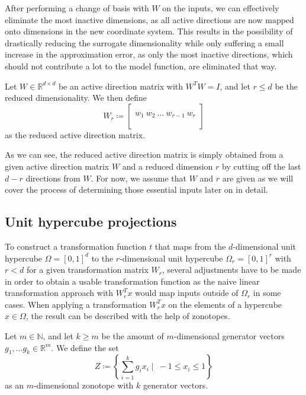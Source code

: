\documentclass[
  a4paper,  %
  twoside,  %
  bibliography=totoc,
  headsepline,
  cleardoublepage=empty,
  parskip=half,
  draft=false
]{scrbook}
\begin{document}
After performing a change of basis with $W$ on the inputs, we can effectively eliminate the most inactive dimensions, as all active directions are now mapped onto dimensions in the new coordinate system.
This results in the possibility of drastically reducing the surrogate dimensionality while only suffering a small increase in the approximation error, as only the most inactive directions, which should not contribute a lot to the model function, are eliminated that way.

\begin{definition}
Let $W \in \mathds{R}^{d \times d}$ be an active direction matrix with $W^T W=I$, and let $r \leq d$ be the reduced dimensionality.
We then define
\begin{equation}
W_r \coloneqq \begin{bmatrix}
  \\
    w_1 ~ w_2 ~ \dots ~ w_{r-1} ~ w_r\\
    \\
  \end{bmatrix}
\end{equation}
as the reduced active direction matrix.
\end{definition}
%
As we can see, the reduced active direction matrix is simply obtained from a given active direction matrix $W$ and a reduced dimension $r$ by cutting off the last $d - r$ directions from $W$.
For now, we assume that $W$ and $r$ are given as we will cover the process of determining those essential inputs later on in detail.

\subsection{Unit hypercube projections}

To construct a transformation function $t$ that maps from the $d$-dimensional unit hypercube $\Omega=[0,1]^d$ to the $r$-dimensional unit hypercube $\Omega_r=[0,1]^r$ with $r < d$ for a given transformation matrix $W_r$, several adjustments have to be made in order to obtain a usable transformation function as the naive linear transformation approach with $W_r^T x$ would map inputs outside of $\Omega_r$ in some cases.
When applying a transformation $W_r^T x$ on the elements of a hypercube $x \in \Omega$, the result can be described with the help of zonotopes.

\begin{definition}[Zonotope]
Let $m \in \mathds{N}$, and let $k \geq m$ be the amount of $m$-dimensional generator vectors $g_1, \dots g_k \in \mathds{R}^m$.
We define the set
\begin{equation}
Z \coloneqq \left\{\sum_{i=1}^k g_i x_i \mid ~ -1 \leq x_i \leq 1\right\}
  \label{zonotope}
\end{equation}
as an $m$-dimensional zonotope with $k$ generator vectors.
\end{definition}
\end{document}
